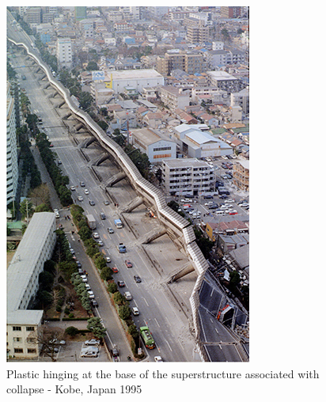 \documentclass[11pt,a4paper]{report}
\begin{document}
\begin{figure}[!h]
	\centering
	\begin{minipage}[b]{0.4\textwidth}
		\includegraphics[width=\textwidth]{example1}
		\caption{Plastic hinging at the base of the superstructure associated with collapse - Kobe, Japan 1995 }
		\label{kobe}
	\end{minipage}
	\hfill
	\begin{minipage}[b]{0.4\textwidth}

\end{minipage}
\end{figure}
\end{document}
